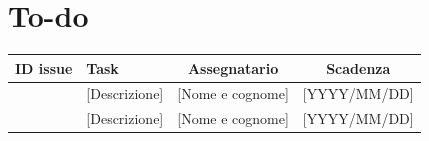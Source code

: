 \documentclass[11pt, a4paper]{article}
\begin{document}
\section{To-do}
\begin{table}[h]
    \centering
    \renewcommand{\arraystretch}{1.5}
    \begin{tabularx}{\textwidth}{|c|X|c|c|}
        \hline
        \rowcolor{gray!10} 
        \textbf{ID issue} & 
        \textbf{Task} & 
        \textbf{Assegnatario} & 
        \textbf{Scadenza} \\
        \hline
        [- o \#numero] & [Descrizione] & [Nome e cognome] & [YYYY/MM/DD] \\
        \hline
        [- o \#numero] & [Descrizione] & [Nome e cognome] & [YYYY/MM/DD] \\
        \hline
    \end{tabularx}
\end{table}
\end{document}
